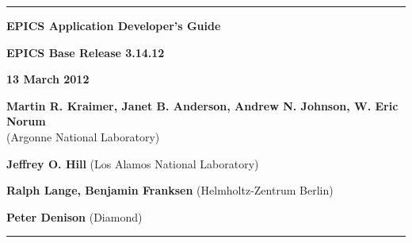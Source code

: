 \hrule

\vspace{1in}

\noindent \Huge \textbf{EPICS Application Developer's Guide}

\vspace{0.5in}

\noindent \Large \textbf{EPICS Base Release 3.14.12}

\noindent \textbf{13 March 2012}

\vspace{0.5in}

\noindent \normalsize \textbf{Martin R. Kraimer, Janet B. Anderson, Andrew N. Johnson, W. Eric Norum}\\
(Argonne National Laboratory)

\noindent \textbf{Jeffrey O. Hill} (Los Alamos National Laboratory)

\noindent \textbf{Ralph Lange, Benjamin Franksen} (Helmholtz-Zentrum Berlin)

\noindent \textbf{Peter Denison} (Diamond)

\vspace{1in}
\hrule

